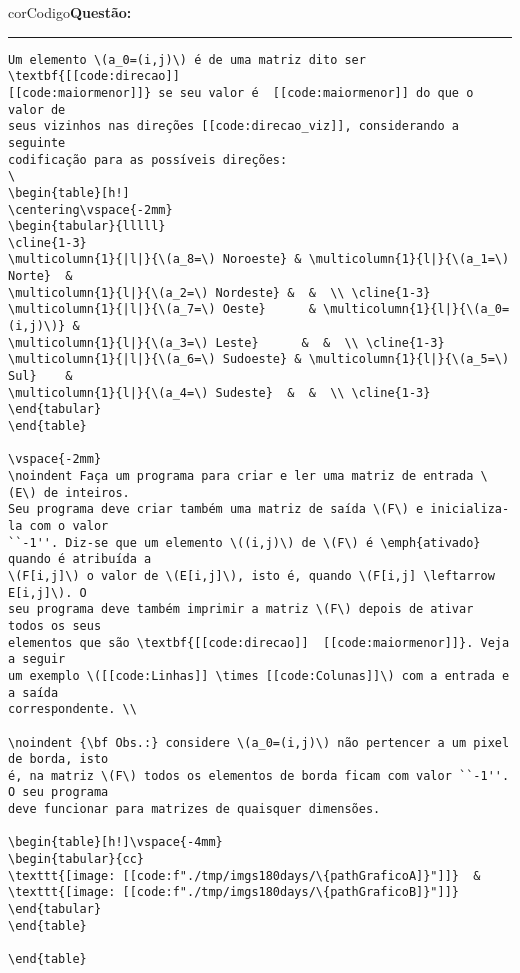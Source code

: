 \begin{listing}[!ht]
\begin{myboxCode}{corCodigo}{\textbf{Questão: } }\vspace{3mm}
\hrule
{\footnotesize
\begin{verbatim}
Um elemento \(a_0=(i,j)\) é de uma matriz dito ser \textbf{[[code:direcao]]
[[code:maiormenor]]} se seu valor é  [[code:maiormenor]] do que o valor de 
seus vizinhos nas direções [[code:direcao_viz]], considerando a seguinte
codificação para as possíveis direções: 
\
\begin{table}[h!]
\centering\vspace{-2mm}
\begin{tabular}{lllll}
\cline{1-3}
\multicolumn{1}{|l|}{\(a_8=\) Noroeste} & \multicolumn{1}{l|}{\(a_1=\) Norte}  & 
\multicolumn{1}{l|}{\(a_2=\) Nordeste} &  &  \\ \cline{1-3}
\multicolumn{1}{|l|}{\(a_7=\) Oeste}      & \multicolumn{1}{l|}{\(a_0=(i,j)\)} &
\multicolumn{1}{l|}{\(a_3=\) Leste}      &  &  \\ \cline{1-3}
\multicolumn{1}{|l|}{\(a_6=\) Sudoeste} & \multicolumn{1}{l|}{\(a_5=\) Sul}    & 
\multicolumn{1}{l|}{\(a_4=\) Sudeste}  &  &  \\ \cline{1-3}
\end{tabular}
\end{table}

\vspace{-2mm}
\noindent Faça um programa para criar e ler uma matriz de entrada \(E\) de inteiros. 
Seu programa deve criar também uma matriz de saída \(F\) e inicializa-la com o valor 
``-1''. Diz-se que um elemento \((i,j)\) de \(F\) é \emph{ativado} quando é atribuída a 
\(F[i,j]\) o valor de \(E[i,j]\), isto é, quando \(F[i,j] \leftarrow E[i,j]\). O 
seu programa deve também imprimir a matriz \(F\) depois de ativar todos os seus 
elementos que são \textbf{[[code:direcao]]  [[code:maiormenor]]}. Veja a seguir 
um exemplo \([[code:Linhas]] \times [[code:Colunas]]\) com a entrada e a saída 
correspondente. \\

\noindent {\bf Obs.:} considere \(a_0=(i,j)\) não pertencer a um pixel de borda, isto 
é, na matriz \(F\) todos os elementos de borda ficam com valor ``-1''. O seu programa 
deve funcionar para matrizes de quaisquer dimensões. 
 
\begin{table}[h!]\vspace{-4mm}
\begin{tabular}{cc}
\texttt{[image: [[code:f"./tmp/imgs180days/\{pathGraficoA]}"]]}  &  
\texttt{[image: [[code:f"./tmp/imgs180days/\{pathGraficoB]}"]]}  
\end{tabular}
\end{table}

\end{table}
\end{verbatim}
}
\end{myboxCode}
\caption{Questão paramétrica com matriz -- Parte 1: Descrição de questão.}
\label{lst:questaoMatrizRosaParte1}
\end{listing}



